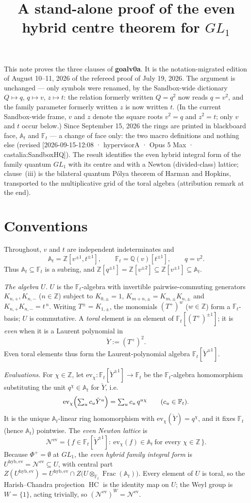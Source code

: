 \documentclass[11pt]{article}
\title{\textbf{A stand-alone proof of the even hybrid centre theorem for $GL_1$}}
\author{}
\date{}
\newcommand{\At}{\mathbb{A}_t}
\newcommand{\Ft}{\mathbb{F}_t}
\newcommand{\Nev}{\mathcal N^{\mathrm{ev}}}
\newcommand{\Uev}{U^{\mathrm{hyb,ev}}}
\newcommand{\HC}{\operatorname{HC}}
\newcommand{\Yc}{\check Y}
\newcommand{\Z}{\mathbb Z}
\newcommand{\ev}{\mathrm{ev}}
\begin{document}
\maketitle

\noindent
This note proves the three clauses of \textbf{goalv0a}. It is the
notation-migrated edition of August 10--11, 2026 of the refereed proof of July 19,
2026. The argument is unchanged --- only symbols were renamed, by the Sandbox-wide
dictionary $Q\mapsto q$, $q\mapsto v$, $z\mapsto t$: the relation formerly written
$Q=q^{2}$ now reads $q=v^{2}$, and the family parameter formerly written $z$ is now
written $t$. (In the current Sandbox-wide frame, $v$ and $z$ denote the square roots
$v^{2}=q$ and $z^{2}=t$; only $v$ and $t$ occur below.) Since September 15, 2026 the
rings are printed in blackboard face, $\At$ and $\Ft$ --- a change of face only: the two
macro definitions and nothing else (revised [2026-09-15-12:08 · hypervisorA · Opus 5 Max · castalia:SandboxHQ]). The result identifies the
even hybrid integral form of the family quantum $GL_1$ with its centre and with a
Newton (divided-class) lattice; clause~(iii) is the bilateral quantum P\'olya
theorem of Harman and Hopkins, transported to the multiplicative grid of the
toral algebra (attribution remark at the end).

\section{Conventions}

Throughout, $v$ and $t$ are independent indeterminates and
\[
  \At=\Z[v^{\pm1},t^{\pm1}],\qquad
  \Ft=\mathbb Q(v)[t^{\pm1}],\qquad
  q=v^{2}.
\]
Thus $\At\subseteq\Ft$ is a subring, and $\Z[q^{\pm1}]=\Z[v^{\pm2}]\subseteq
\Z[v^{\pm1}]\subseteq\At$.

\emph{The algebra $U$.}\;
$U$ is the $\Ft$-algebra with invertible pairwise-commuting generators
$K_{n,+},K_{n,-}$ ($n\in\Z$) subject to
$K_{0,\pm}=1$, $K_{m+n,\pm}=K_{m,\pm}K_{n,\pm}$ and $K_{n,+}K_{n,-}=t^{\,n}$.
Writing $T^{\pm}=K_{1,\pm}$, the monomials $(T^{+})^{w}$ ($w\in\Z$) form a
$\Ft$-basis; $U$ is commutative. A \emph{toral} element is an element of
$\Ft[(T^{+})^{\pm1}]$; it is \emph{even} when it is a Laurent polynomial in
\[
  \Yc:=(T^{+})^{2}.
\]
Even toral elements thus form the Laurent-polynomial algebra
$\Ft[\Yc^{\pm1}]$.

\emph{Evaluations.}\;
For $\chi\in\Z$, let $\ev_\chi\colon\Ft[\Yc^{\pm1}]\to\Ft$ be the
$\Ft$-algebra homomorphism substituting the unit $q^{\chi}\in\At$ for $\Yc$,
i.e.
\[
  \ev_\chi\Bigl(\textstyle\sum_{u}c_u\Yc^{u}\Bigr)=\sum_u c_u\,q^{u\chi}
  \qquad(c_u\in\Ft).
\]
It is the unique $\At$-linear ring homomorphism with $\ev_\chi(\Yc)=q^{\chi}$,
and it fixes $\Ft$ (hence $\At$) pointwise. The \emph{even Newton lattice} is
\[
  \Nev=\bigl\{\,f\in\Ft[\Yc^{\pm1}]:\ \ev_\chi(f)\in\At\ \text{for every }
  \chi\in\Z\,\bigr\}.
\]
Because $\Phi^{+}=\emptyset$ at $GL_1$, the \emph{even hybrid family integral
form} is $\Uev=\Nev\subseteq U$, with central part
$Z(\Uev)=\Uev\cap Z\bigl(U\otimes_{\Ft}\operatorname{Frac}(\At)\bigr)$. Every
element of $U$ is toral, so the Harish--Chandra projection $\HC$ is the identity
map on $U$; the Weyl group is $W=\{1\}$, acting trivially, so
$(\Nev)^{W}=\Nev$.
\end{document}
